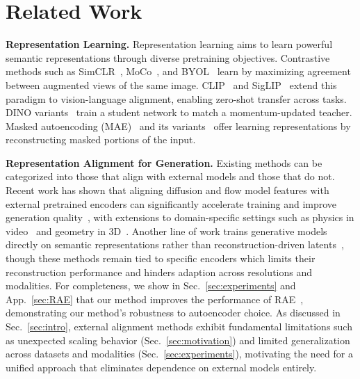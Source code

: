 \section{Related Work}
\label{sec:related}

\textbf{Representation Learning.} Representation learning aims to learn powerful semantic representations through diverse pretraining objectives. Contrastive methods such as SimCLR~\citep{simclr}, MoCo~\citep{moco,mocov2,mocov3}, and BYOL~\citep{byol} learn by maximizing agreement between augmented views of the same image. CLIP~\citep{clip} and SigLIP~\citep{siglip,siglip2} extend this paradigm to vision-language alignment, enabling zero-shot transfer across tasks. DINO variants~\citep{dino,dinov2,dinov3} train a student network to match a momentum-updated teacher. Masked autoencoding (MAE)~\citep{Vincent2010StackedDA,Pathak2016ContextEF} and its variants~\citep{mae,beit,ijepa} offer learning representations by reconstructing masked portions of the input.  

\textbf{Representation Alignment for Generation.} Existing methods can be categorized into those that align with external models and those that do not. Recent work has shown that aligning diffusion and flow model features with external pretrained encoders can significantly accelerate training and improve generation quality~\citep{repa,ldit,repae,repaet2i2025,wurstchen}, with extensions to domain-specific settings such as physics in video~\citep{videorepa} and geometry in 3D~\citep{Wu2025GeometryFM}. Another line of work trains generative models directly on semantic representations rather than reconstruction-driven latents~\citep{wu2025representation,rae}, though these methods remain tied to specific encoders which limits their reconstruction performance and hinders adaption across resolutions and modalities. For completeness, we show in Sec.~\ref{sec:experiments} and App.~\ref{sec:RAE} that our method improves the performance of RAE~\citep{rae}, demonstrating our method's robustness to autoencoder choice. 
As discussed in Sec.~\ref{sec:intro}, external alignment methods exhibit fundamental limitations such as unexpected scaling behavior (Sec.~\ref{sec:motivation}) and limited generalization across datasets and modalities (Sec.~\ref{sec:experiments}), motivating the need for a unified approach that eliminates dependence on external models entirely.

